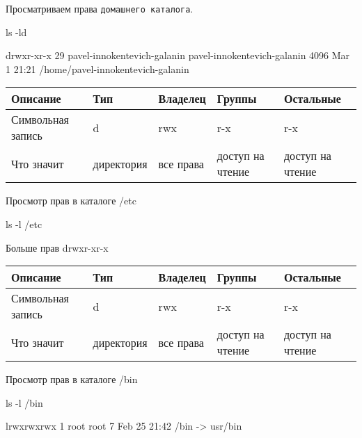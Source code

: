 Просматриваем права \verb|домашнего каталога|.

\begin{BashBox}
    ls -ld ~
\end{BashBox}

\begin{OutBox}
    drwxr-xr-x 29 pavel-innokentevich-galanin pavel-innokentevich-galanin 4096 Mar  1 21:21 /home/pavel-innokentevich-galanin
\end{OutBox}

\begin{table}[h!]
    \centering
    \begin{tabular}{ | l | l | l | l | l | }
        \hline
        Описание            & Тип       & Владелец  & Группы            & Остальные       \\ \hline
        \hline
        Символьная  запись  & d         & rwx       & r-x               & r-x             \\ \hline
        Что значит          & директория& все права & доступ на чтение  & доступ на чтение\\ \hline
    \end{tabular}
\end{table}

Просмотр прав в каталоге /etc

\begin{BashBox}
    ls -l /etc
\end{BashBox}

Больше прав drwxr-xr-x

\begin{table}[h!]
    \centering
    \begin{tabular}{ | l | l | l | l | l | }
        \hline
        Описание            & Тип       & Владелец  & Группы            & Остальные       \\ \hline
        \hline
        Символьная  запись  & d         & rwx       & r-x               & r-x             \\ \hline
        Что значит          & директория& все права & доступ на чтение  & доступ на чтение\\ \hline
    \end{tabular}
\end{table}

Просмотр прав в каталоге /bin

\begin{BashBox}
    ls -l /bin
\end{BashBox}

\begin{OutBox}
    lrwxrwxrwx 1 root root 7 Feb 25 21:42 /bin -> usr/bin
\end{OutBox}

